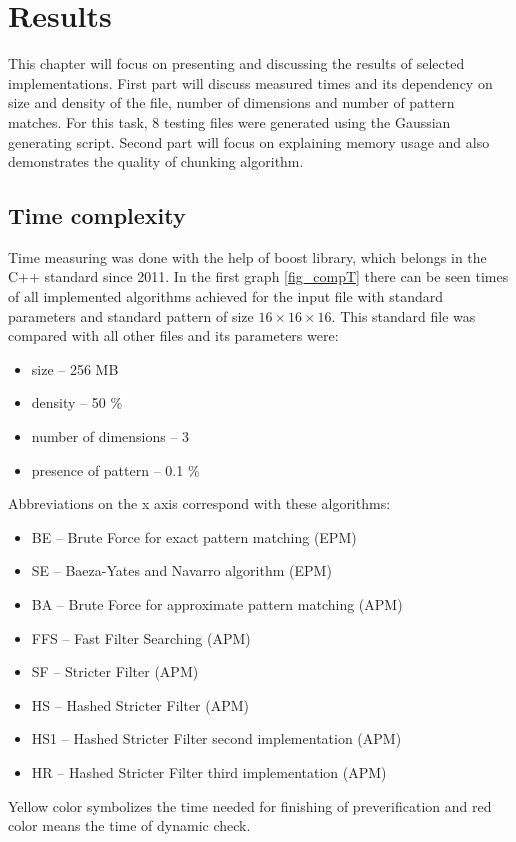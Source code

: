 \chapter{Results}
This chapter will focus on presenting and discussing the results of selected implementations. First part will discuss measured times and its dependency on size and density of the file, number of dimensions and number of pattern matches. For this task, 8 testing files were generated using the Gaussian generating script. Second part will focus on explaining memory usage and also demonstrates the quality of chunking algorithm.

\section{Time complexity}
Time measuring was done with the help of boost library, which belongs in the C++ standard since 2011. In the first graph \ref{fig_compT} there can be seen times of all implemented algorithms achieved for the input file with standard parameters and standard pattern of size $16\times16\times16$. This standard file was compared with all other files and its parameters were:
\begin{itemize}
\item size -- 256 MB
\item density -- 50 \%
\item number of dimensions -- 3
\item presence of pattern -- 0.1 \%
\end{itemize}

Abbreviations on the x axis correspond with these algorithms:
\begin{itemize}
\item BE -- Brute Force for exact pattern matching (EPM)
\item SE -- Baeza-Yates and Navarro algorithm (EPM)
\item BA -- Brute Force for approximate pattern matching (APM)
\item FFS -- Fast Filter Searching (APM)
\item SF -- Stricter Filter (APM)
\item HS -- Hashed Stricter Filter (APM)
\item HS1 -- Hashed Stricter Filter second implementation (APM)
\item HR -- Hashed Stricter Filter third implementation (APM)
\end{itemize}

Yellow color symbolizes the time needed for finishing of preverification and red color means the time of dynamic check.

